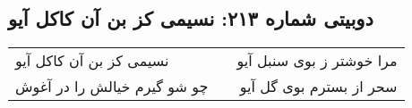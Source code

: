 \begin{center}
\section*{دوبیتی شماره ۲۱۳: نسیمی کز بن آن کاکل آیو}
\label{sec:213}
\begin{longtable}{l p{0.5cm} r}
نسیمی کز بن آن کاکل آیو
&&
مرا خوشتر ز بوی سنبل آیو
\\
چو شو گیرم خیالش را در آغوش
&&
سحر از بسترم بوی گل آیو
\\
\end{longtable}
\end{center}
